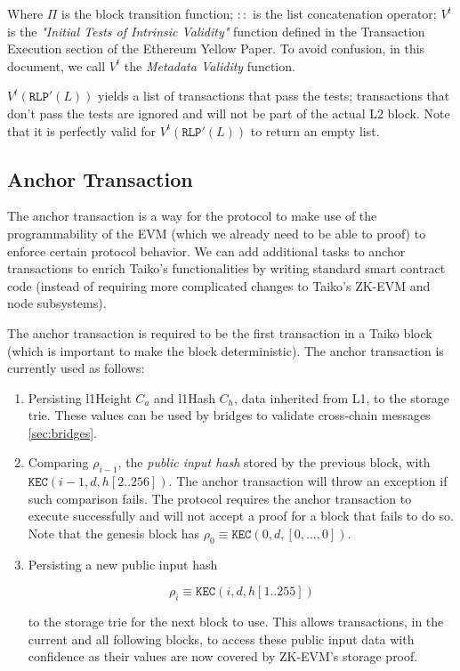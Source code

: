 \documentclass[9pt,oneside]{amsart}
\begin{document}
\begin{multicols}{2}
Where $\Pi$ is the block transition function; $::$ is the list concatenation operator; $V^t$ is the \emph{"Initial Tests of Intrinsic Validity"} function defined in the Transaction Execution section of the Ethereum Yellow Paper. To avoid confusion, in this document, we call $V^t$ the \emph{Metadata Validity} function.

$V^t(\texttt{RLP}'(L))$ yields a list of transactions that pass the tests; transactions that don't pass the tests are ignored and will not be part of the actual L2 block. Note that it is perfectly valid for $V^t(\texttt{RLP}'(L))$ to return an empty list.

\subsection{Anchor Transaction} \label{sec:anchoring}

The anchor transaction is a way for the protocol to make use of the programmability of the EVM (which we already need to be able to proof) to enforce certain protocol behavior. We can add additional tasks to anchor transactions to enrich Taiko's functionalities by writing standard smart contract code (instead of requiring more complicated changes to Taiko's ZK-EVM and node subsystems).

The anchor transaction is required to be the first transaction in a Taiko block (which is important to make the block deterministic). The anchor transaction is currently used as follows:

\begin{enumerate}
\item Persisting l1Height $C_a$ and l1Hash $C_h$, data inherited from L1, to the storage trie. These values can be used by bridges to validate cross-chain messages \ref{sec:bridges}.
\item Comparing $\rho_{i-1}$, the \textit{public input hash} stored by the previous block, with $\texttt{KEC}(i-1, d, h[2..256])$. The anchor transaction will throw an exception if such comparison fails. The protocol requires the anchor transaction to execute successfully and will not accept a proof for a block that fails to do so. Note that the genesis block has $\rho_0 \equiv \texttt{KEC}(0, d, [0,...,0])$.
\item Persisting a new public input hash

$$\rho_i \equiv \texttt{KEC}(i, d, h[1..255])$$ 

to the storage trie for the next block to use. This allows transactions, in the current and all following blocks, to access these public input data with confidence as their values are now covered by ZK-EVM's storage proof.
\end{enumerate}


\end{multicols}
\end{document}
